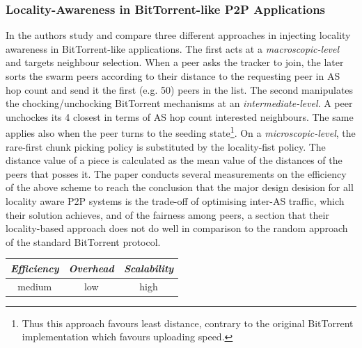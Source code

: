 \subsubsection{Locality-Awareness in BitTorrent-like P2P Applications}
In \cite{LCLX2009} the authors study and compare three different
approaches in injecting locality awareness in BitTorrent-like applications. The
first acts at a \emph{macroscopic-level} and targets neighbour selection. When a
peer asks the tracker to join, the later sorts the swarm peers according to
their distance to the requesting peer in AS hop count and send it the first
(e.g. 50) peers in the list. The second manipulates the chocking/unchocking
BitTorrent mechanisms at an \emph{intermediate-level}. A peer unchockes its 4
closest in terms of AS hop count interested neighbours. The same applies also
when the peer turns to the seeding state\footnote{Thus this approach favours
least distance, contrary to the original BitTorrent implementation which favours
uploading speed.}. On a \emph{microscopic-level}, the rare-first chunk picking
policy is substituted by the locality-fist policy. The distance value of a piece
is calculated as the mean value of the distances of the peers that posses it.
The paper conducts several measurements on the efficiency of the above scheme to
reach the conclusion that the major design desision for all locality aware P2P
systems is the trade-off of optimising inter-AS traffic, which their solution
achieves, and of the fairness among peers, a section that their locality-based
approach does not do well in comparison to the random approach of the standard
BitTorrent protocol.

\begin{center}
\begin{tabular}{ccc}
\emph{Efficiency} & \emph{Overhead} & \emph{Scalability} \\
\hline
medium &
low &
%
high
\end{tabular}
\end{center}

